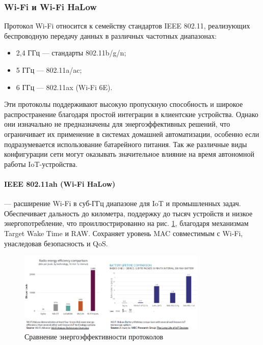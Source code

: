 \documentclass[a4paper,12pt]{article}
\begin{document}
\subsubsection{Wi-Fi и Wi-Fi HaLow}

Протокол Wi-Fi относится к семейству стандартов IEEE 802.11, реализующих беспроводную передачу данных в различных частотных диапазонах:
\begin{itemize}
    \item 2{,}4 ГГц — стандарты 802.11b/g/n;
    \item 5 ГГц — 802.11a/ac;
    \item 6 ГГц — 802.11ax (Wi-Fi 6E).
\end{itemize}
Эти протоколы поддерживают высокую пропускную способность и широкое распространение благодаря простой интеграции в клиентские устройства. Однако они изначально не предназначены для энергоэффективных решений, что ограничивает их применение в системах домашней автоматизации, особенно если подразумевается использование батарейного питания. Так же различные виды конфигурации сети могут оказывать значительное влияние на время автономной работы IoT-устройства. \cite{WifiSmartHome}


\paragraph{IEEE 802.11ah (Wi-Fi HaLow)} — расширение Wi-Fi в суб-ГГц диапазоне для IoT и промышленных задач. Обеспечивает дальность до километра, поддержку до тысяч устройств и низкое энергопотребление, что проиллюстрированно на рис.  \ref{fig:wifi_energy_eff}, благодаря механизмам Target Wake Time и RAW. Сохраняет уровень MAC совместимым с Wi-Fi, унаследовав безопасность и QoS.

\begin{figure}[h]
    \centering
    \includegraphics[width=0.8\textwidth]{images/WiFiEnergyEff.png}
    \caption{Сравнение энергоэффективности протоколов \cite{IMG_protocol_compare_power_eff}}
    \label{fig:wifi_energy_eff}
\end{figure}
\end{document}
